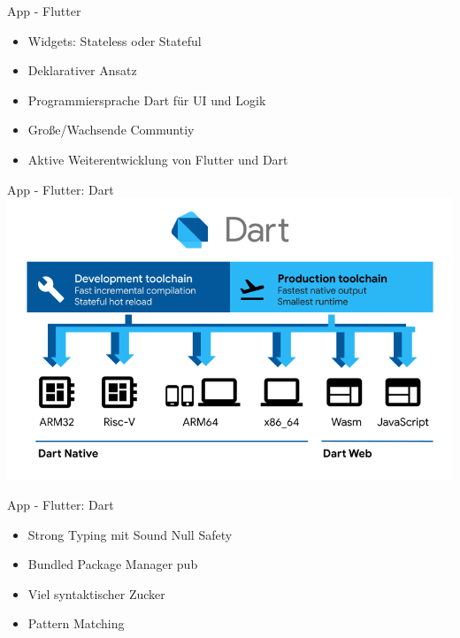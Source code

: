 \begin{frame}{App - Flutter}
	\centering
	\begin{itemize}
		\item Widgets: Stateless oder Stateful
		\item Deklarativer Ansatz
		\item Programmiersprache Dart für UI und Logik
		\item Große/Wachsende Communtiy
		\item Aktive Weiterentwicklung von Flutter und Dart
	\end{itemize}
\end{frame}

\begin{frame}{App - Flutter: Dart}
	\centering
	\includegraphics[height=1.0\textheight]{images/app/flutter/dart-diagram-small}
\end{frame}

\begin{frame}{App - Flutter: Dart}
	\centering
	\begin{itemize}
		\item Strong Typing mit Sound Null Safety
		\item Bundled Package Manager pub
		\item Viel syntaktischer Zucker
		\item Pattern Matching
	\end{itemize}
\end{frame}

